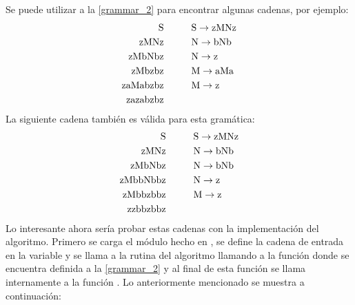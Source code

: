 Se puede utilizar a la \cref{grammar_2} para encontrar algunas cadenas, por ejemplo:
\begin{equation*}
    \begin{split}
        \text{S} & \hspace{1cm} \text{S} \to \text{zMNz} \\
        \text{zMNz} & \hspace{1cm} \text{N} \to \text{bNb} \\
        \text{zMbNbz} & \hspace{1cm} \text{N} \to \text{z} \\
        \text{zMbzbz} & \hspace{1cm} \text{M} \to \text{aMa} \\
        \text{zaMabzbz} & \hspace{1cm} \text{M} \to \text{z} \\
        \text{zazabzbz} & 
    \end{split}
\end{equation*}
La siguiente cadena también es válida para esta gramática:
\begin{equation*}
    \begin{split}
        \text{S} & \hspace{1cm} \text{S} \to \text{zMNz} \\
        \text{zMNz} & \hspace{1cm} \text{N} \to \text{bNb} \\
        \text{zMbNbz} & \hspace{1cm} \text{N} \to \text{bNb} \\
        \text{zMbbNbbz} & \hspace{1cm} \text{N} \to \text{z} \\
        \text{zMbbzbbz} & \hspace{1cm} \text{M} \to \text{z} \\
        \text{zzbbzbbz} & 
    \end{split}
\end{equation*}
Lo interesante ahora sería probar estas cadenas con la implementación del algoritmo. Primero se carga el módulo hecho en , se define la cadena de entrada en la variable  y se llama a la rutina del algoritmo llamando a la función  donde se encuentra definida a la \cref{grammar_2} y al final de esta función se llama internamente a la función . Lo anteriormente mencionado se muestra a continuación:
